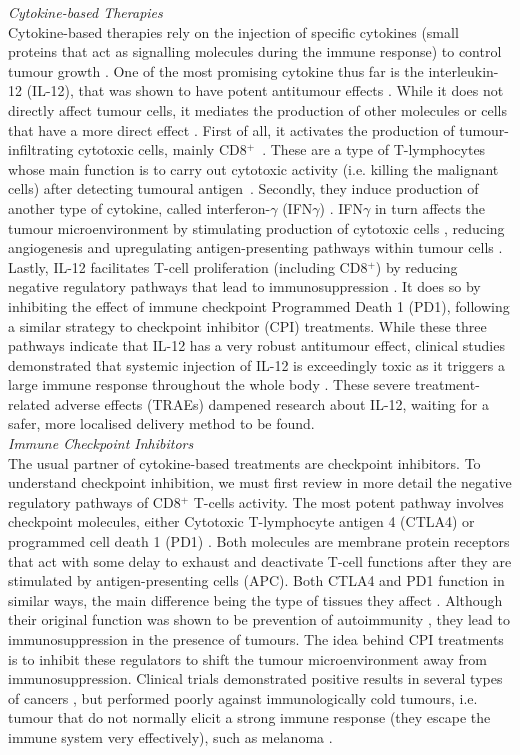 \documentclass[11pt]{article}
\begin{document}
\textit{Cytokine-based Therapies}\\[3pt]
Cytokine-based therapies rely on the injection of specific cytokines (small proteins that act as signalling molecules during the immune response) to control tumour growth \cite{ioDef}. One of the most promising cytokine thus far is the interleukin-12 (IL-12), that was shown to have potent antitumour effects \cite{il12IsCool}. While it does not directly affect tumour cells, it mediates the production of other molecules or cells that have a more direct effect \cite{il12CytokineStorm}. First of all, it activates the production of tumour-infiltrating cytotoxic cells, mainly CD8$^+$~\cite{cd8FirstWay}. These are a type of T-lymphocytes whose main function is to carry out cytotoxic activity (i.e. killing the malignant cells) after detecting tumoural antigen~\cite{cd8Effects}. Secondly, they induce production of another type of cytokine, called interferon-$\gamma$ (IFN$\gamma$) \cite{ifnIL12}. IFN$\gamma$ in turn affects the tumour microenvironment by stimulating production of cytotoxic cells \cite{ifngNKProd}, reducing angiogenesis \cite{ifngAngiogenesis} and upregulating antigen-presenting pathways within tumour cells \cite{ifngAntigenExposure}. Lastly, IL-12 facilitates T-cell proliferation (including CD8$^+$) by reducing negative regulatory pathways that lead to immunosuppression \cite{reducImmunoSuppression}. It does so by inhibiting the effect of immune checkpoint Programmed Death 1 (PD1), following a similar strategy to checkpoint inhibitor (CPI) treatments. While these three pathways indicate that IL-12 has a very robust antitumour effect, clinical studies demonstrated that systemic injection of IL-12 is exceedingly toxic as it triggers a large immune response throughout the whole body \cite{clintriAC1}\cite{clintriAC2}. These severe treatment-related adverse effects (TRAEs) dampened research about IL-12, waiting for a safer, more localised delivery method to be found.\\[12pt]
%
\noindent\textit{Immune Checkpoint Inhibitors}\\[3pt]
The usual partner of cytokine-based treatments are checkpoint inhibitors. To understand checkpoint inhibition, we must first review in more detail the negative regulatory pathways of CD8$^+$ T-cells activity. The most potent pathway involves checkpoint molecules, either Cytotoxic T-lymphocyte antigen 4 (CTLA4) or programmed cell death 1 (PD1) \cite{cpiProof}. Both molecules are membrane protein receptors that act with some delay to exhaust and deactivate T-cell functions after they are stimulated by antigen-presenting cells (APC). Both CTLA4 and PD1 function in similar ways, the main difference being the type of tissues they affect \cite{PDvsCTLA}. Although their original function was shown to be prevention of autoimmunity \cite{PD1Autoimmune}, they lead to immunosuppression in the presence of tumours. The idea behind CPI treatments is to inhibit these regulators to shift the tumour microenvironment away from immunosuppression. Clinical trials demonstrated positive results in several types of cancers , but performed poorly against immunologically cold tumours, i.e. tumour that do not normally elicit a strong immune response (they escape the immune system very effectively), such as melanoma \cite{antiCTLA4Mel}.
\end{document}
